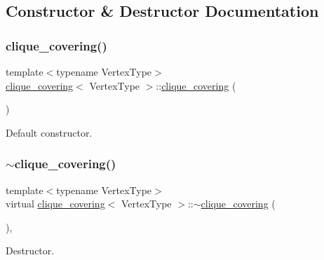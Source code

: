 \subsection{Constructor \& Destructor Documentation}
\mbox{\label{classclique__covering_a00aee81e82d36e7ed0b91f1f3778518e}} 
\subsubsection{\texorpdfstring{clique\+\_\+covering()}{clique\_covering()}}
{\footnotesize\ttfamily template$<$typename Vertex\+Type$>$ \\
\hyperlink{classclique__covering}{clique\+\_\+covering}$<$ Vertex\+Type $>$\+::\hyperlink{classclique__covering}{clique\+\_\+covering} (\begin{DoxyParamCaption}{ }\end{DoxyParamCaption})\hspace{0.3cm}{\ttfamily [default]}}



Default constructor. 

\mbox{\label{classclique__covering_aac1e12323281aea1d4c8939c1445267f}} 
\subsubsection{\texorpdfstring{$\sim$clique\+\_\+covering()}{~clique\_covering()}}
{\footnotesize\ttfamily template$<$typename Vertex\+Type$>$ \\
virtual \hyperlink{classclique__covering}{clique\+\_\+covering}$<$ Vertex\+Type $>$\+::$\sim$\hyperlink{classclique__covering}{clique\+\_\+covering} (\begin{DoxyParamCaption}{ }\end{DoxyParamCaption})\hspace{0.3cm}{\ttfamily [inline]}, {\ttfamily [virtual]}}



Destructor. 



